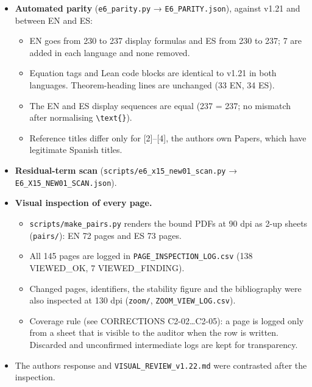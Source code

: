 \documentclass[
]{article}
\newcounter{none} %
\providecommand{\tightlist}{%
  \setlength{\itemsep}{0pt}\setlength{\parskip}{0pt}}
\begin{document}
\begin{itemize}
\tightlist
\item
  \textbf{Automated parity} (\texttt{e6\_parity.py} →
  \texttt{E6\_PARITY.json}), against v1.21 and between EN and ES:

  \begin{itemize}
  \tightlist
  \item
    EN goes from 230 to 237 display formulas and ES from 230 to 237; 7
    are added in each language and none removed.
  \item
    Equation tags and Lean code blocks are identical to v1.21 in both
    languages. Theorem-heading lines are unchanged (33 EN, 34 ES).
  \item
    The EN and ES display sequences are equal (237 = 237; no mismatch
    after normalising \texttt{\textbackslash{}text\{\}}).
  \item
    Reference titles differ only for {[}2{]}--{[}4{]}, the
    author\textquotesingle s own Papers, which have legitimate Spanish
    titles.
  \end{itemize}
\item
  \textbf{Residual-term scan} (\texttt{scripts/e6\_x15\_new01\_scan.py}
  → \texttt{E6\_X15\_NEW01\_SCAN.json}).
\item
  \textbf{Visual inspection of every page.}

  \begin{itemize}
  \tightlist
  \item
    \texttt{scripts/make\_pairs.py} renders the bound PDFs at 90 dpi as
    2-up sheets (\texttt{pairs/}): EN 72 pages and ES 73 pages.
  \item
    All 145 pages are logged in \texttt{PAGE\_INSPECTION\_LOG.csv} (138
    VIEWED\_OK, 7 VIEWED\_FINDING).
  \item
    Changed pages, identifiers, the stability figure and the
    bibliography were also inspected at 130 dpi (\texttt{zoom/},
    \texttt{ZOOM\_VIEW\_LOG.csv}).
  \item
    Coverage rule (see CORRECTIONS C2-02\ldots C2-05): a page is logged
    only from a sheet that is visible to the auditor when the row is
    written. Discarded and unconfirmed intermediate logs are kept for
    transparency.
  \end{itemize}
\item
  The author\textquotesingle s response and
  \texttt{VISUAL\_REVIEW\_v1.22.md} were contrasted after the
  inspection.
\end{itemize}
\end{document}
